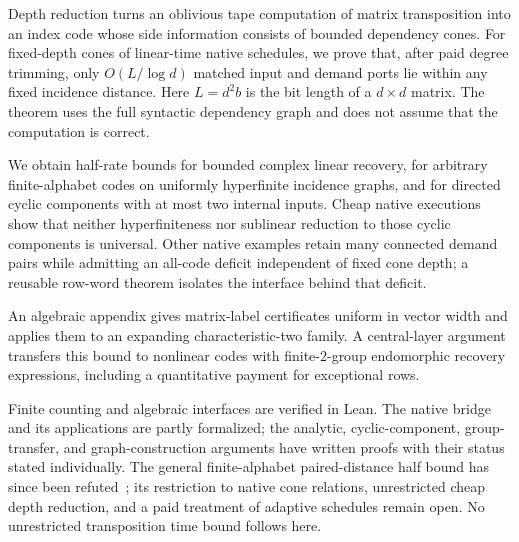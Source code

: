 Depth reduction turns an oblivious tape computation of matrix transposition into an index code whose side information consists of bounded dependency cones. For fixed-depth cones of linear-time native schedules, we prove that, after paid degree trimming, only $O(L/\log d)$ matched input and demand ports lie within any fixed incidence distance. Here $L=d^2b$ is the bit length of a $d\times d$ matrix. The theorem uses the full syntactic dependency graph and does not assume that the computation is correct.

We obtain half-rate bounds for bounded complex linear recovery, for arbitrary finite-alphabet codes on uniformly hyperfinite incidence graphs, and for directed cyclic components with at most two internal inputs. Cheap native executions show that neither hyperfiniteness nor sublinear reduction to those cyclic components is universal. Other native examples retain many connected demand pairs while admitting an all-code deficit independent of fixed cone depth; a reusable row-word theorem isolates the interface behind that deficit.

An algebraic appendix gives matrix-label certificates uniform in vector width and applies them to an expanding characteristic-two family. A central-layer argument transfers this bound to nonlinear codes with finite-$2$-group endomorphic recovery expressions, including a quantitative payment for exceptional rows.

Finite counting and algebraic interfaces are verified in Lean. The native bridge and its applications are partly formalized; the analytic, cyclic-component, group-transfer, and graph-construction arguments have written proofs with their status stated individually. The general finite-alphabet paired-distance half bound has since been refuted~\cite{StorageCodes2026}; its restriction to native cone relations, unrestricted cheap depth reduction, and a paid treatment of adaptive schedules remain open. No unrestricted transposition time bound follows here.
